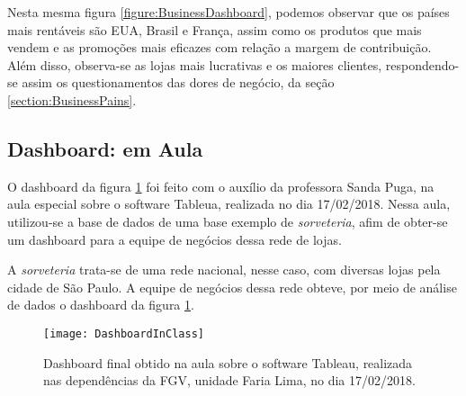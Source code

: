 Nesta mesma figura \ref{figure:BusinessDashboard}, podemos observar que os países mais rentáveis são EUA, Brasil e França, assim como os produtos que mais vendem e as promoções mais eficazes com relação a margem de contribuição. Além disso, observa-se as lojas mais lucrativas e os maiores clientes, respondendo-se assim os questionamentos das dores de negócio, da seção \ref{section:BusinessPains}.

\subsection{Dashboard: em Aula}

O dashboard da figura \ref{figure:TableauDashboardInClass} foi feito com o auxílio da professora Sanda Puga, na aula especial sobre o software Tableua\texttrademark{}, realizada no dia 17/02/2018. Nessa aula, utilizou-se a base de dados de uma base exemplo de \emph{sorveteria}, afim de obter-se um dashboard para a equipe de negócios dessa rede de lojas.

A \emph{sorveteria} trata-se de uma rede nacional, nesse caso, com diversas lojas pela cidade de São Paulo. A equipe de negócios dessa rede obteve, por meio de análise de dados o dashboard da figura \ref{figure:TableauDashboardInClass}.

\begin{center}
\begin{figure}[h]
\begin{centering}
\texttt{[image: DashboardInClass]}
\par\end{centering}
  \caption{\label{figure:TableauDashboardInClass}Dashboard final obtido na aula sobre o software Tableau\texttrademark{}, realizada nas dependências da FGV, unidade Faria Lima, no dia 17/02/2018.}
\end{figure}
\vspace*{-40pt}
\end{center}

